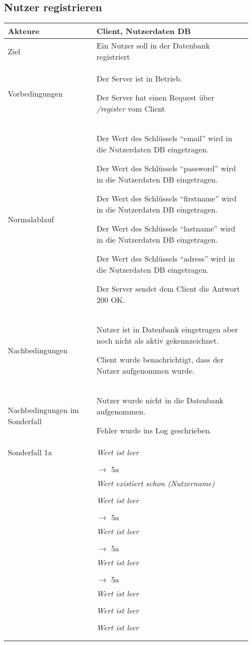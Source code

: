 \documentclass[a4paper,10pt,titlepage]{article}
\makeatletter
\newcommand\novspace{\@minipagetrue}
\newenvironment{owncompactitem}{%
\compactitem
}{%
\@finalstrut\@arstrutbox
\@nameuse{endcompactitem}%
\aftergroup\let\aftergroup\@finalstrut\aftergroup\@gobble
}
\newenvironment{owncompactenum}{%
\compactenum
}{%
\@finalstrut\@arstrutbox
\@nameuse{endcompactenum}%
\aftergroup\let\aftergroup\@finalstrut\aftergroup\@gobble
}
\newcommand{\usecase}[7]
{\subsection{#1}
\setlength{\extrarowheight}{2pt}
\begin{tabular}{|p{0.2\textwidth}|p{0.9\textwidth}|}
\hline
  Akteure & #2\\\hline
  Ziel & #3\\\hline
  Vorbedingungen & \novspace
  	\begin{owncompactitem}[-] #4 \end{owncompactitem} \\\hline
  Normalablauf & \vspace{-7pt}
  	\begin{owncompactenum}[1.] #6 \end{owncompactenum} \\\hline
  Nachbedingungen & \novspace
  	\begin{owncompactitem}[-] #5 \end{owncompactitem} \\\hline
  #7
\end{tabular}
}
\newcommand{\sonderfall}[4][\empty]
{
Sonderfall #2 & \vspace{-10pt}
	\textit{#3}
	\begin{owncompactenum}[{#2}.1] {#4} \end{owncompactenum}
  	\ifthenelse{\equal{#1}{\empty}}
    	{\\\hline} %
    	{\ensuremath{\rightarrow} #1 \\ [+1pt] \hline} %

}
\newcommand{\kurzersonderfall}[3][\empty]
{
Sonderfall #2 & \vspace{-10pt}
	\textit{#3}
  	\ifthenelse{\equal{#1}{\empty}}
    	{\\\hline} %
    	{\\&\ensuremath{\rightarrow} #1 \\ [+1pt] \hline} %

}
\newcommand{\sondernachbedingung}[1]
{
Nachbedingungen im Sonderfall& \novspace
	\begin{owncompactitem}[-]
		#1
	\end{owncompactitem} \\\hline
}
\makeatother
\begin{document}
\usecase{Nutzer registrieren}{Client, Nutzerdaten DB}%
{Ein Nutzer soll in der Datenbank registriert}%
{%
  \item Der Server ist in Betrieb.
  \item Der Server hat einen Request über \textit{/register} vom Client
}
{%
  \item Nutzer ist in Datenbank eingetragen aber noch nicht als aktiv gekennzeichnet.
  \item Client wurde benachrichtigt, dass der Nutzer aufgenommen wurde.
}
{%
  \item  Der Wert des Schlüssels "`email"' wird in die Nutzerdaten DB eingetragen.
  \item  Der Wert des Schlüssels "`password"' wird in die Nutzerdaten DB eingetragen.
  \item  Der Wert des Schlüssels "`firstname"' wird in die Nutzerdaten DB eingetragen.
  \item  Der Wert des Schlüssels "`lastname"' wird in die Nutzerdaten DB eingetragen.
  \item  Der Wert des Schlüssels "`adress"' wird in die Nutzerdaten DB eingetragen.
  \item  Der Server sendet dem Client die Antwort 200 OK.

}
{%
  \sondernachbedingung{
	\item Nutzer wurde nicht in die Datenbank aufgenommen.
	\item Fehler wurde ins Log geschrieben.
	}

  \kurzersonderfall[5a]{1a}%
	  {Wert ist leer}%
  
  \sonderfall[Fehler]{1b}%
	  {Wert existiert schon (Nutzername)}%
	  {
	  \item Der Fehler wird ins Log geschrieben.
	  \item Dem Client wird ein entsprechender Fehler übermittelt.
	  } 

  
  \kurzersonderfall[5a]{2a}%
	  {Wert ist leer}%
  
  \kurzersonderfall[5a]{3a}%
	  {Wert ist leer}%
	  
  \kurzersonderfall[5a]{4a}%
	  {Wert ist leer}%
	  
  \sonderfall[Fehler]{5a}%
	  {Wert ist leer}%
	  {
	  \item Der Fehler wird ins Log geschrieben.
	  \item Dem Client wird ein entsprechender Fehler übermittelt.
	  }
  \sonderfall[Fehler]{5a.2}%
	  {Wert ist leer}%
	  {
	  \item Der Fehler wird ins Log geschrieben.
	  }
	

  \sonderfall[Fehler, weiter mit Normalablauf]{6a}%
	  {Wert ist leer}%
	  {
	  \item Der Fehler wird ins Log geschrieben.
	  }
}
\end{document}
